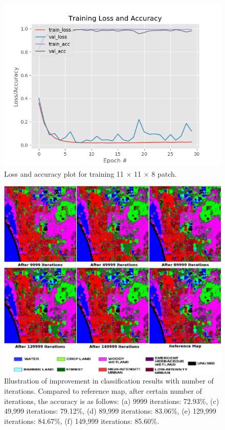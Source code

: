 \documentclass[letterpaper, 10 pt, conference]{ieeeconf}  %
\begin{document}
\begin{figure}[htb]
	\centering
	\includegraphics[scale=0.6]{results_11dim.png}
	\caption{Loss and accuracy plot for training 11 $\times$ 11 $\times$ 8 patch.}
	\label{figurelabel}
\end{figure}


\begin{figure}[!t]
	\centering
	\includegraphics[scale=0.8]{iterations.png}
	\caption{Illustration of improvement in classification results with number of iterations. Compared to reference map, after certain number of iterations, the accuracy is as follows: (a) 9999 iterations: 72.93\%, (c) 49,999 iterations: 79.12\%, (d) 89,999 iterations: 83.06\%, (e) 129,999 iterations: 84.67\%, (f) 149,999 iterations: 85.60\%.}
	\label{figurelabel}
\end{figure}
\end{document}
